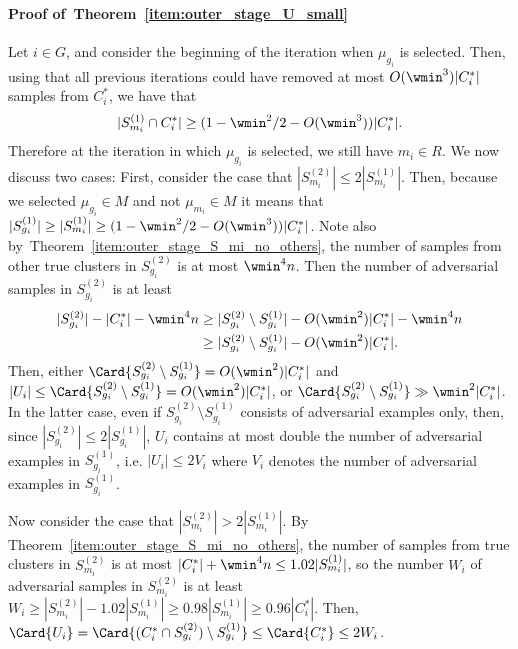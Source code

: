 \paragraph{Proof of~Theorem~\ref{item:outer_stage_U_small}}
Let \(i \in G\), 
and consider the beginning of the iteration when \(\mu_{g_i}\) is selected.  
Then, using that all previous iterations could have removed at most $O(\wmin^3) |C_i^*|$ samples from $C_i^*$, we have that \[|S_{m_i}^{(1)} \cap C_i^*| \geq (1-\wmin^2/2-O(\wmin^3))|C_i^*|.\]
Therefore at the iteration in which $\mu_{g_i}$ is selected, we still have $m_i \in R$.
We now discuss two cases: First, consider the case that $|S_{m_i}^{(2)}| \leq 2 |S_{m_i}^{(1)}|$. Then, because we selected $\mu_{g_i} \in M$ and not $\mu_{m_i} \in M$ it means that $|S_{g_i}^{(1)}| \geq |S_{m_i}^{(1)}| \geq (1-\wmin^2/2-O(\wmin^3))|C_i^*|$.
Note also by~Theorem~\ref{item:outer_stage_S_mi_no_others}, the number of samples from other true clusters in $S_{g_i}^{(2)}$ is at most $\wmin^4 n$.
Then the number of adversarial samples in $S_{g_i}^{(2)}$ is at least 
\begin{equation*}
\begin{aligned}
    |S_{g_i}^{(2)}| - |C_i^*| - \wmin^4 n &\geq |S_{g_i}^{(2)} \setminus S_{g_i}^{(1)}| - O(\wmin^2) |C_i^*| - \wmin^4 n \\ 
    &\geq |S_{g_i}^{(2)} \setminus S_{g_i}^{(1)}| - O(\wmin^2)|C_i^*|.
\end{aligned}
\end{equation*}
Then, either  $\Card{S_{g_i}^{(2)} \setminus S_{g_i}^{(1)}} = O(\wmin^2) |C_i^*|$ and $|U_i| \leq \Card{S_{g_i}^{(2)} \setminus S_{g_i}^{(1)}} = O(\wmin^2)|C_i^*|$, or $\Card{S_{g_i}^{(2)} \setminus S_{g_i}^{(1)}} \gg \wmin^2 |C_i^*|$. In the latter case, even if  $S_{g_i}^{(2)} \setminus S_{g_i}^{(1)}$ consists of adversarial examples only, then, since $|S_{g_i}^{(2)}| \leq 2 |S_{g_i}^{(1)}|$,  $U_i$ contains at most double the number of adversarial examples in $S_{g_i}^{(1)}$, i.e. $|U_i| \leq  2V_i$ where \(V_i\) denotes the number of adversarial examples in $S_{g_i}^{(1)}$. 

Now consider the case that $|S_{m_i}^{(2)}| > 2 |S_{m_i}^{(1)}|$.
By Theorem~\ref{item:outer_stage_S_mi_no_others}, the number of samples from true clusters in $S_{m_i}^{(2)}$ is at most $|C_i^*| + \wmin^4 n \leq 1.02 |S_{m_i}^{(1)}|$, so the number $W_i$ of adversarial samples in $S_{m_i}^{(2)}$  %
is at least $W_i \geq |S_{m_i}^{(2)}| - 1.02|S_{m_i}^{(1)}| \geq 0.98 |S_{m_i}^{(1)}| \geq 0.96 |C_i^*|$.
Then, \(\Card{U_i} = \Card{(C_i^* \cap S_{g_i}^{(2)}) \setminus S_{g_i}^{(1)}} \leq \Card{C_i^*} \leq 2 W_i\). 

